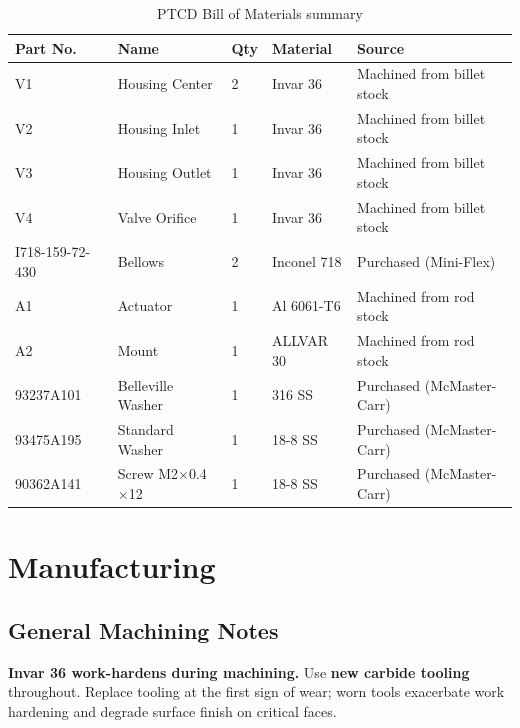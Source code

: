 \documentclass[12pt, letterpaper]{report}%
\newcounter{mycounter}           %
\newcounter{sub}[mycounter]      %
\begin{document}
\begin{appendices}
	\begin{table}[H]
		\centering
		\caption{PTCD Bill of Materials summary}
		\label{tab:mfg_parts}
		\small
		\begin{tabularx}{\textwidth}{llllX}
			\toprule
			\textbf{Part No.} & \textbf{Name} & \textbf{Qty} & \textbf{Material} & \textbf{Source} \\
			\midrule
			V1 & Housing Center   & 2 & Invar 36    & Machined from billet stock \\
			V2 & Housing Inlet    & 1 & Invar 36    & Machined from billet stock \\
			V3 & Housing Outlet   & 1 & Invar 36    & Machined from billet stock \\
			V4 & Valve Orifice    & 1 & Invar 36    & Machined from billet stock \\
			I718-159-72-430 & Bellows & 2 & Inconel 718 & Purchased (Mini-Flex) \\
			A1 & Actuator         & 1 & Al 6061-T6  & Machined from rod stock \\
			A2 & Mount            & 1 & ALLVAR 30   & Machined from rod stock \\
			93237A101 & Belleville Washer & 1 & 316 SS & Purchased (McMaster-Carr) \\
			93475A195 & Standard Washer   & 1 & 18-8 SS & Purchased (McMaster-Carr) \\
			90362A141 & Screw M2$\times$0.4$\times$12 & 1 & 18-8 SS & Purchased (McMaster-Carr) \\
			\bottomrule
		\end{tabularx}
	\end{table}

	\section{Manufacturing}
	\label{sec:mfg}

	\subsection{General Machining Notes}
	\label{sec:mfg:general}

	\begin{notebox}
	\textbf{Invar 36 work-hardens during machining.} Use \textbf{new carbide tooling}
	throughout. Replace tooling at the first sign of wear; worn tools exacerbate work
	hardening and degrade surface finish on critical faces.
	\end{notebox}


\end{appendices}
\end{document}
